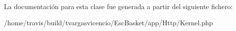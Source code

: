 \-La documentación para esta clase fue generada a partir del siguiente fichero\-:\begin{DoxyCompactItemize}
\item 
/home/travis/build/tvargasvicencio/\-Esc\-Basket/app/\-Http/\-Kernel.\-php\end{DoxyCompactItemize}
